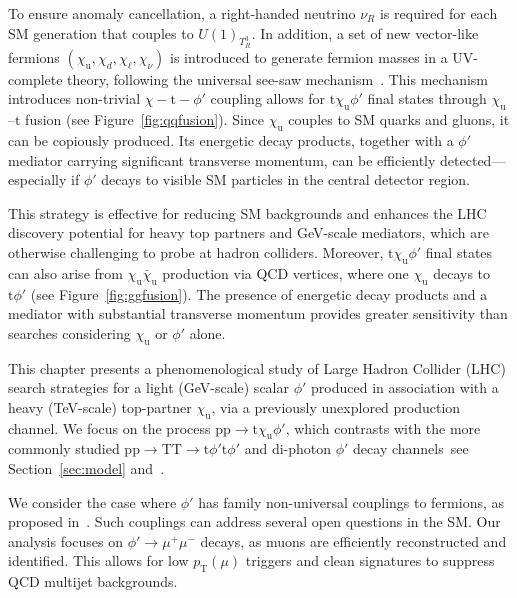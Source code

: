 To ensure anomaly cancellation, a right-handed neutrino $\nu_R$ is required for each SM generation that couples to $U(1)_{T^3_R}$. In addition, a set of new vector-like fermions $(\chi_\mathrm{u}, \chi_d, \chi_\ell, \chi_\nu)$ is introduced to generate fermion masses in a UV-complete theory, following the universal see-saw mechanism~\parencite{Berezhiani, Chang1987, Davidson1987, Rajpoot1987, Babu1989, Babu1990}. This mechanism introduces non-trivial $\chi - \mathrm{t} -\phi'$ coupling allows for $\mathrm{t}\chi_\mathrm{u} \phi'$ final states through $\chi_\mathrm{u}$--$\mathrm{t}$ fusion (see Figure~\ref{fig:qqfusion}). Since $\chi_\mathrm{u}$ couples to SM quarks and gluons, it can be copiously produced. Its energetic decay products, together with a $\phi'$ mediator carrying significant transverse momentum, can be efficiently detected—especially if $\phi'$ decays to visible SM particles in the central detector region.

This strategy is effective for reducing SM backgrounds and enhances the LHC discovery potential for heavy top partners and GeV-scale mediators, which are otherwise challenging to probe at hadron colliders. Moreover, $\mathrm{t}\chi_\mathrm{u} \phi'$ final states can also arise from $\chi_\mathrm{u}\bar\chi_\mathrm{u}$ production via QCD vertices, where one $\chi_\mathrm{u}$ decays to $\mathrm{t}\phi'$ (see Figure~\ref{fig:ggfusion}). The presence of energetic decay products and a mediator with substantial transverse momentum provides greater sensitivity than searches considering $\chi_\mathrm{u}$ or $\phi'$ alone.

This chapter presents a phenomenological study of Large Hadron Collider (LHC) search strategies for a light (GeV-scale) scalar $\phi'$ produced in association with a heavy (TeV-scale) top-partner $\chi_\mathrm{u}$, via a previously unexplored production channel. We focus on the process $\mathrm{pp}\to \mathrm{t}\chi_\mathrm{u} \phi'$, which contrasts with the more commonly studied $\mathrm{pp}\to \mathrm{T}\mathrm{T}\to \mathrm{t}\phi'\mathrm{t}\phi'$ and di-photon $\phi'$ decay channels~see Section~\ref{sec:model} and~\parencite{Bhardwaj_2022, Bhardwaj_2022_2, Bardhan_2023, Banerjee_2016, Alves_2024}.

We consider the case where $\phi'$ has family non-universal couplings to fermions, as proposed in~\parencite{Dutta2020}. Such couplings can address several open questions in the SM. Our analysis focuses on $\phi'\to\mu^+\mu^-$ decays, as muons are efficiently reconstructed and identified. This allows for low $p_{\mathrm{T}}(\mu)$ triggers and clean signatures to suppress QCD multijet backgrounds.

